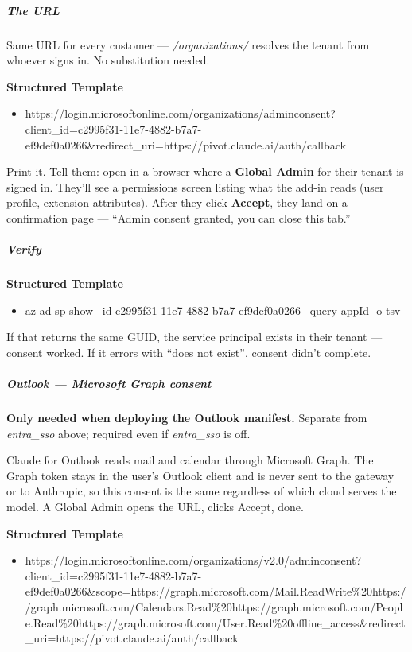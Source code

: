 \documentclass[11pt]{article}
\begin{document}
\subparagraph{The URL}\mbox{}\par

Same URL for every customer — \emph{/organizations/} resolves the tenant from whoever signs in. No substitution needed.


\textbf{Structured Template}
\begin{itemize}[leftmargin=*,itemsep=2pt,topsep=2pt]
\item {} https://login.microsoftonline.com/organizations/adminconsent?client\_\allowbreak{}id=c2995f31-11e7-4882-b7a7-ef9def0a0266\&redirect\_\allowbreak{}uri=https://pivot.claude.ai/auth/callback
\end{itemize}

Print it. Tell them: open in a browser where a \textbf{Global Admin} for their tenant is signed in. They'll see a permissions screen listing what the add-in reads (user profile, extension attributes). After they click \textbf{Accept}, they land on a confirmation page — ``Admin consent granted, you can close this tab.''


\subparagraph{Verify}\mbox{}\par

\textbf{Structured Template}
\begin{itemize}[leftmargin=*,itemsep=2pt,topsep=2pt]
\item {} az ad sp show --id c2995f31-11e7-4882-b7a7-ef9def0a0266 --query appId -o tsv
\end{itemize}

If that returns the same GUID, the service principal exists in their tenant — consent worked. If it errors with ``does not exist'', consent didn't complete.


\subparagraph{Outlook — Microsoft Graph consent}\mbox{}\par

\textbf{Only needed when deploying the Outlook manifest.} Separate from \emph{entra\_\allowbreak{}sso} above; required even if \emph{entra\_\allowbreak{}sso} is off.


Claude for Outlook reads mail and calendar through Microsoft Graph. The Graph token stays in the user's Outlook client and is never sent to the gateway or to Anthropic, so this consent is the same regardless of which cloud serves the model. A Global Admin opens the URL, clicks Accept, done.


\textbf{Structured Template}
\begin{itemize}[leftmargin=*,itemsep=2pt,topsep=2pt]
\item {} https://login.microsoftonline.com/organizations/v2.0/adminconsent?client\_\allowbreak{}id=c2995f31-11e7-4882-b7a7-ef9def0a0266\&scope=https://graph.microsoft.com/Mail.ReadWrite\%20https://graph.microsoft.com/Calendars.Read\%20https://graph.microsoft.com/People.Read\%20https://graph.microsoft.com/User.Read\%20offline\_\allowbreak{}access\&redirect\_\allowbreak{}uri=https://pivot.claude.ai/auth/callback
\end{itemize}
\end{document}
